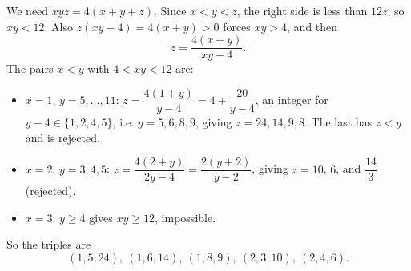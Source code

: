 We need $xyz=4(x+y+z)$. Since $x<y<z$, the right side is less than $12z$, so $xy<12$. Also $z(xy-4)=4(x+y)>0$ forces $xy>4$, and then
\[
z=\dfrac{4(x+y)}{xy-4}.
\]
The pairs $x<y$ with $4<xy<12$ are:
\begin{itemize}
\item $x=1$, $y=5,\dots,11$: $z=\dfrac{4(1+y)}{y-4}=4+\dfrac{20}{y-4}$, an integer for $y-4\in\{1,2,4,5\}$, i.e. $y=5,6,8,9$, giving $z=24,14,9,8$. The last has $z<y$ and is rejected.
\item $x=2$, $y=3,4,5$: $z=\dfrac{4(2+y)}{2y-4}=\dfrac{2(y+2)}{y-2}$, giving $z=10$, $6$, and $\dfrac{14}{3}$ (rejected).
\item $x=3$: $y\ge4$ gives $xy\ge12$, impossible.
\end{itemize}
So the triples are
\[
\boxed{(1,5,24),\ (1,6,14),\ (1,8,9),\ (2,3,10),\ (2,4,6)}.
\]
